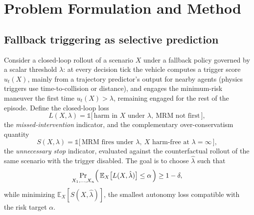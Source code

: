 \documentclass[lettersize,journal]{IEEEtran}
\begin{document}
\section{Problem Formulation and Method}
\label{sec:method}

\subsection{Fallback triggering as selective prediction}
\label{sec:formulation}
Consider a closed-loop rollout of a scenario $X$ under a fallback
policy governed by a scalar threshold $\lambda$: at every decision tick
the vehicle computes a trigger score $u_t(X)$, mainly from a trajectory
predictor's output for nearby agents (physics triggers use time-to-collision or distance), and engages the minimum-risk
maneuver the first time $u_t(X) > \lambda$, remaining engaged for the
rest of the episode. Define the closed-loop loss
\begin{equation}
L(X,\lambda) = \mathbb{1}\bigl[\, \text{harm in } X \text{ under }
\lambda,\ \text{MRM not first} \,\bigr],
\label{eq:loss}
\end{equation}
the \emph{missed-intervention} indicator, and the complementary
over-conservatism quantity
\begin{equation}
S(X,\lambda) = \mathbb{1}\bigl[\, \text{MRM fires under } \lambda,\
X \text{ harm-free at } \lambda=\infty \,\bigr],
\label{eq:stop}
\end{equation}
the \emph{unnecessary stop} indicator, evaluated against the
counterfactual rollout of the same scenario with the trigger disabled.
The goal is to choose $\hat\lambda$ such that
\begin{equation}
\Pr_{X_1,\dots,X_n}\Bigl(\, \mathbb{E}_X\bigl[L(X,\hat\lambda)\bigr] \le
\alpha \,\Bigr) \ge 1-\delta,
\label{eq:guarantee}
\end{equation}
while minimizing $\mathbb{E}_X[S(X,\hat\lambda)]$, the smallest
autonomy loss compatible with the risk target $\alpha$.
\end{document}
